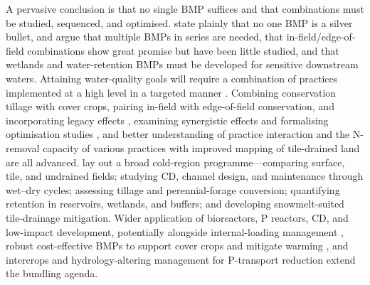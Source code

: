 \documentclass[11pt]{article}
\begin{document}
A pervasive conclusion is that no single BMP suffices and that combinations must be studied, sequenced, and optimised. \textcite{Sunohara2016} state plainly that no one BMP is a silver bullet, and \textcite{Lenhart2016} argue that multiple BMPs in series are needed, that in-field/edge-of-field combinations show great promise but have been little studied, and that wetlands and water-retention BMPs must be developed for sensitive downstream waters. Attaining water-quality goals will require a combination of practices implemented at a high level in a targeted manner \parencite{Christianson2014}. Combining conservation tillage with cover crops, pairing in-field with edge-of-field conservation, and incorporating legacy effects \parencite{Makhtoumi2025}, examining synergistic effects and formalising optimisation studies \parencite{Kreig2019}, and better understanding of practice interaction and the N-removal capacity of various practices with improved mapping of tile-drained land \parencite{McLellan2015} are all advanced. \textcite{Baulch2019} lay out a broad cold-region programme---comparing surface, tile, and undrained fields; studying CD, channel design, and maintenance through wet--dry cycles; assessing tillage and perennial-forage conversion; quantifying retention in reservoirs, wetlands, and buffers; and developing snowmelt-suited tile-drainage mitigation. Wider application of bioreactors, P reactors, CD, and low-impact development, potentially alongside internal-loading management \parencite{Husk2024,Husk2017}, robust cost-effective BMPs to support cover crops and mitigate warming \parencite{Gupta2023}, and intercrops and hydrology-altering management for P-transport reduction \parencite{HernandezRamirez2011,GAYNOR1995b} extend the bundling agenda.
\end{document}
